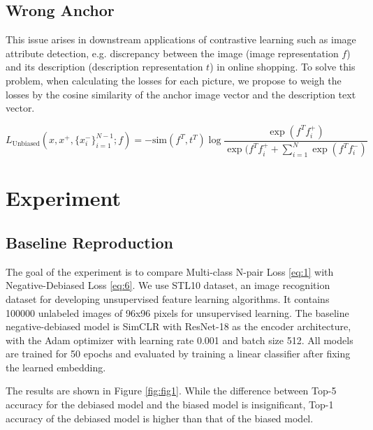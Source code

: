 \documentclass{article}
\begin{document}
\subsection{Wrong Anchor}
This issue arises in downstream applications of contrastive learning such as image attribute detection, e.g. discrepancy between the image (image representation $f$) and its description (description representation $t$) in online shopping. To solve this problem, when calculating the losses for each picture, we propose to weigh the losses by the cosine similarity of the anchor image vector and the description text vector.

\begin{equation} \label{eq:15}
L_{\text{Unbiased}}(x, x^+, \{x_i^-\}_{i=1}^{N-1}; f) = - \text{sim} (f^T, t^T) \log \frac{\exp(f^T f_i^+)}{\exp(f^T f_i^+ + \sum_{i=1}^N \exp(f^T f_i^-)}
\end{equation}


\section{Experiment}
\subsection{Baseline Reproduction}

The goal of the experiment is to compare Multi-class N-pair Loss \ref{eq:1} with Negative-Debiased Loss \ref{eq:6}. We use STL10 \citep{pmlr-v15-coates11a} dataset, an image recognition dataset for developing unsupervised feature learning algorithms. It contains 100000 unlabeled images of 96x96 pixels for unsupervised learning. The baseline negative-debiased model is SimCLR \citep{Chen2020SimCLR} with ResNet-18 \citep{7780459} as the encoder architecture, with the Adam optimizer \citep{Diederik2014Adam} with learning rate 0.001 and batch size 512. All models are trained for 50 epochs and evaluated by training a linear classifier after fixing the learned embedding.

 The results are shown in Figure \ref{fig:fig1}. While the difference between Top-5 accuracy for the debiased model and the biased model is insignificant, Top-1 accuracy of the debiased model is higher than that of the biased model. 
\end{document}
